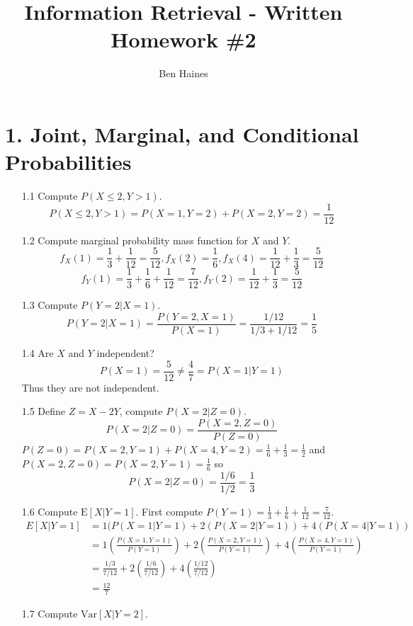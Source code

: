 \documentclass[paper=a4, fontsize=11pt]{jhwhw} %
\begin{document}
\title{Information Retrieval - Written Homework \#2}
\author{Ben Haines}

\section*{1. Joint, Marginal, and Conditional Probabilities} 
\solution
\begin{enumerate}
    \item [1.1] Compute $P(X \le 2, Y > 1)$.
        $$P(X \le 2, Y > 1) = P(X = 1, Y = 2) + P(X = 2, Y = 2) = \frac{1}{12}$$
    \item [1.2] Compute marginal probability mass function for $X$ and $Y$.
        $$f_X(1)  = \frac{1}{3} + \frac{1}{12} = \frac{5}{12}, f_X(2) = \frac{1}{6}, f_X(4) = \frac{1}{12} + \frac{1}{3} = \frac{5}{12}$$
        $$f_Y(1)  = \frac{1}{3} + \frac{1}{6} + \frac{1}{12} = \frac{7}{12}, f_Y(2) = \frac{1}{12} + \frac{1}{3} = \frac{5}{12}$$
    \item [1.3] Compute $P(Y = 2|X = 1)$.
        $$P(Y = 2|X = 1) = \frac{P(Y = 2, X = 1)}{P(X = 1)} = \frac{1/12}{1/3 + 1/12} = \frac{1}{5}$$
    \item [1.4] Are $X$ and $Y$ independent?\\
        $$P(X = 1) = \frac{5}{12} \not= \frac{4}{7} = P(X = 1|Y = 1)$$
        Thus they are not independent.
    \item [1.5] Define $Z = X - 2Y$, compute $P(X = 2|Z = 0)$. 
        $$P(X = 2|Z = 0) = \frac{P(X = 2, Z = 0)}{P(Z = 0)}$$
        $P(Z = 0) = P(X = 2, Y = 1) + P(X = 4, Y = 2) = \frac{1}{6} + \frac{1}{3} = \frac{1}{2}$ and
        $P(X = 2, Z = 0) = P(X = 2, Y = 1) = \frac{1}{6}$ so 
        $$P(X = 2|Z = 0) = \frac{1/6}{1/2} = \frac{1}{3}$$
    \item [1.6] Compute $\mathrm{E}[X|Y = 1]$.
        First compute $P(Y = 1) = \frac{1}{3} + \frac{1}{6} + \frac{1}{12} = \frac{7}{12}$.
        \begin{align*}
            E[X|Y = 1] &= 1(P(X = 1|Y = 1) + 2(P(X = 2| Y = 1)) + 4(P(X = 4|Y = 1))\\
                       &= 1(\frac{P(X = 1, Y = 1)}{P(Y = 1)}) + 2(\frac{P(X = 2, Y = 1)}{P(Y = 1)}) + 4(\frac{P(X = 4, Y = 1)}{P(Y = 1)})\\
                       &= \frac{1/3}{7/12} + 2(\frac{1/6}{7/12}) + 4(\frac{1/12}{7/12})\\
                       &= \frac{12}{7}
        \end{align*}
    \item [1.7] Compute $\mathrm{Var}[X|Y = 2]$.

\end{enumerate}
\end{document}
